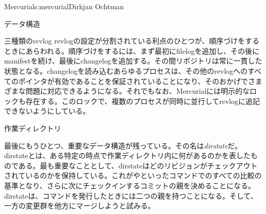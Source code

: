 \begin{aosachapter}{Mercurial}{s:mercurial}{Dirkjan Ochtman}
\begin{aosasect1}{データ構造}
\begin{aosasect2}{三種類のrevlog}
revlogの設定が分割されている利点のひとつが、順序づけをするときにあらわれる。順序づけをするには、まず最初にfilelogを追加し、その後にmanifestを続け、最後にchangelogを追加する。その間リポジトリは常に一貫した状態となる。changelogを読み込むあらゆるプロセスは、その他のrevlogへのすべてのポインタが有効であることを保証されていることになり、そのおかげでさまざまな問題に対応できるようになる。それでもなお、Mercurialには明示的なロックも存在する。このロックで、複数のプロセスが同時に並行してrevlogに追記できないようにしている。

\end{aosasect2}

\begin{aosasect2}{作業ディレクトリ}

最後にもうひとつ、重要なデータ構造が残っている。その名は\emph{dirstate}だ。dirstateとは、ある特定の時点で作業ディレクトリ内に何があるのかを表したものである。最も重要なこととして、dirstateはどのリビジョンがチェックアウトされているのかを保持している。これがやといったコマンドでのすべての比較の基準となり、さらに次にチェックインするコミットの親を決めることになる。dirstateは、コマンドを発行したときには二つの親を持つことになる。そして、一方の変更群を他方にマージしようと試みる。


\end{aosasect2}
\end{aosasect1}
\end{aosachapter}
